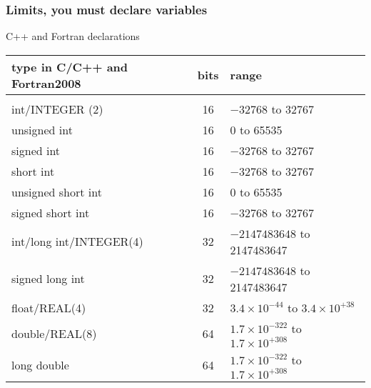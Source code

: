 \documentclass[compress]{beamer}
\begin{document}
\frame
{
  \frametitle{Limits, you must declare variables}
  \begin{block}{C++ and Fortran declarations}
\begin{small}
{\scriptsize
\begin{tabular}{lcl}\hline \hline
\hspace*{\fill} type in C/C++ and Fortran2008 \hspace*{\fill}
&\hspace*{\fill} bits \hspace*{\fill}
&\hspace*{\fill} range \hspace*{\fill} \\ \hline
& & \\[-2mm]
int/INTEGER (2) & 16 & $-32768$ to 32767\\
unsigned int & 16 & 0 to 65535\\
signed int & 16 & $-32768$ to 32767\\
short int & 16 & $-32768$ to 32767\\
unsigned short int & 16 & 0 to 65535\\
signed short int & 16 & $-32768$ to 32767\\
int/long int/INTEGER(4) & 32 & $-2147483648$ to 2147483647\\
signed long int & 32 & $-2147483648$ to 2147483647\\
float/REAL(4) & 32 & $3.4\times 10^{-44}$ to $3.4\times 10^{+38}$\\
double/REAL(8) & 64 & $1.7\times 10^{-322}$ to $1.7\times 10^{+308}$\\
long double & 64 & $1.7\times 10^{-322}$ to $1.7\times 10^{+308}$\\\hline
\end{tabular}
}
\end{small}
  \end{block}
}
\end{document}
